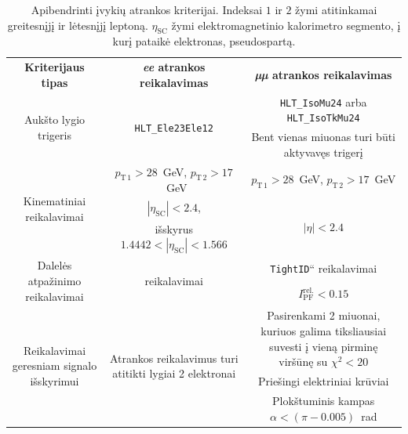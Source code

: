 \documentclass[a4paper, 12pt, oneside]{article}
\newcommand{\ttt}[1]{\texttt{#1}}
\newcommand{\ltq}[1]{{\quotedblbase{}#1\textquotedblleft{}}}
\newlength\q
\begin{document}
\begin{table}[b!]
	\begin{tabular}{|c|c|c|}
		\hline
		\multirow{2}{9em}{\centering\textbf{Kriterijaus tipas}} & \multirow{2}{13em}{\centering\textbf{\textit{ee} atrankos reikalavimas}} &
			\multirow{2}{12em}{\centering\textbf{\textit{µµ} atrankos reikalavimas}}\\
		 & & \\
		\hline\hline
		\multirow{4}{9em}{\centering Aukšto lygio trigeris} & \multirow{4}{12em}{\centering\ttt{HLT\_Ele23Ele12}} &
			\multirow{2}{13em}{\centering\ttt{HLT\_IsoMu24} arba \ttt{HLT\_IsoTkMu24}} \\
		 & & \\ \cline{3-3}
		 & & \multirow{2}{12em}{\centering Bent vienas miuonas turi būti aktyvavęs trigerį} \\
		 & & \\
		\hline\hline
		\multirow{4}{9em}{\centering Kinematiniai reikalavimai} &
			\multirow{2}{13em}{\centering $p_{\mathrm{T \, 1}} > 28$~GeV, $p_{\mathrm{T \, 2}} > 17$~GeV} &
			\multirow{2}{12em}{\centering $p_{\mathrm{T \, 1}} > 28$~GeV, $p_{\mathrm{T \, 2}} > 17$~GeV} \\
		 & & \\ \cline{2-3}
		 & $|\eta_{\mathrm{SC}}| < 2.4$, & \multirow{2}{12em}{\centering $|\eta| < 2.4$} \\
		 & išskyrus $1.4442<|\eta_{\mathrm{SC}}|<1.566$ & \\
		\hline\hline
		\multirow{2}{9em}{\centering Dalelės atpažinimo reikalavimai} & \multirow{2}{13em}{\centering \ltq{\ttt{MediumID}} reikalavimai} &
			\ltq{\ttt{TightID}} reikalavimai \\ \cline{3-3}
		 & & $I_{\mathrm{PF}}^{\mathrm{rel.}}<0.15$ \\
		\hline\hline
		\multirow{7}{9em}{\centering Reikalavimai geresniam signalo išskyrimui} &
			\multirow{7}{13em}{\centering Atrankos reikalavimus turi atitikti lygiai 2 elektronai} &
			\multirow{4}{12em}{\centering Pasirenkami 2 miuonai, kuriuos galima tiksliausiai suvesti į vieną pirminę viršūnę su $\chi^2<20$} \\
		 & & \\
		 & & \\
		 & & \\ \cline{3-3}
		 & & Priešingi elektriniai krūviai \\ \cline{3-3}
		 & & \multirow{2}{12em}{\centering Plokštuminis kampas $\alpha < (\pi - 0.005)$~rad} \\
		 & & \\
		\hline
	\end{tabular}
	\caption{\label{table:selection}Apibendrinti įvykių atrankos kriterijai. Indeksai $1$ ir $2$ žymi atitinkamai greitesnįjį
	ir lėtesnįjį leptoną. $\eta_{\mathrm{SC}}$ žymi elektromagnetinio kalorimetro segmento, į kurį pataikė elektronas, pseudospartą.}
\end{table}
\end{document}
